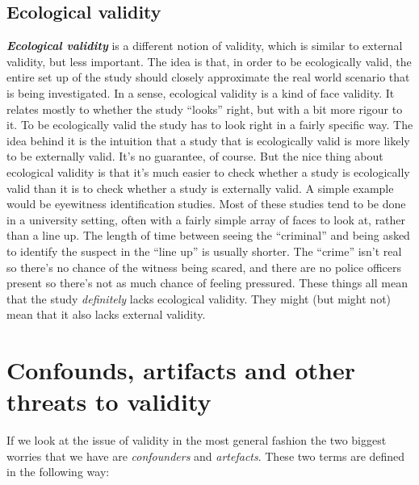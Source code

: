 \documentclass[
]{book}
\begin{document}
\hypertarget{ecological-validity}{%
\subsection{Ecological validity}\label{ecological-validity}}

\textbf{\emph{Ecological validity}} is a different notion of validity, which is similar to external validity, but less important. The idea is that, in order to be ecologically valid, the entire set up of the study should closely approximate the real world scenario that is being investigated. In a sense, ecological validity is a kind of face validity. It relates mostly to whether the study ``looks'' right, but with a bit more rigour to it. To be ecologically valid the study has to look right in a fairly specific way. The idea behind it is the intuition that a study that is ecologically valid is more likely to be externally valid. It's no guarantee, of course. But the nice thing about ecological validity is that it's much easier to check whether a study is ecologically valid than it is to check whether a study is externally valid. A simple example would be eyewitness identification studies. Most of these studies tend to be done in a university setting, often with a fairly simple array of faces to look at, rather than a line up. The length of time between seeing the ``criminal'' and being asked to identify the suspect in the ``line up'' is usually shorter. The ``crime'' isn't real so there's no chance of the witness being scared, and there are no police officers present so there's not as much chance of feeling pressured. These things all mean that the study \emph{definitely} lacks ecological validity. They might (but might not) mean that it also lacks external validity.

\hypertarget{confounds-artifacts-and-other-threats-to-validity}{%
\section{Confounds, artifacts and other threats to validity}\label{confounds-artifacts-and-other-threats-to-validity}}

If we look at the issue of validity in the most general fashion the two biggest worries that we have are \emph{confounders} and \emph{artefacts}. These two terms are defined in the following way:
\end{document}
